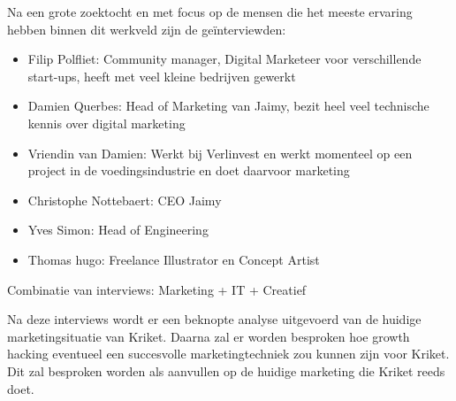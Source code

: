 Na een grote zoektocht en met focus op de mensen die het meeste ervaring hebben binnen dit werkveld zijn de geïnterviewden:
\begin{itemize} 
	\item Filip Polfliet: Community manager, Digital Marketeer voor verschillende start-ups, heeft met veel kleine bedrijven gewerkt
	\item Damien Querbes: Head of Marketing van Jaimy, bezit heel veel technische kennis over digital marketing
	\item Vriendin van Damien: Werkt bij Verlinvest en werkt momenteel op een project in de voedingsindustrie en doet daarvoor marketing
	\item Christophe Nottebaert: CEO Jaimy
	\item Yves Simon: Head of Engineering
	\item Thomas hugo: Freelance Illustrator en Concept Artist
\end{itemize}

Combinatie van interviews: Marketing + IT + Creatief 

Na deze interviews wordt er een beknopte analyse uitgevoerd van de huidige marketingsituatie van Kriket. Daarna zal er worden besproken hoe growth hacking eventueel een succesvolle marketingtechniek zou kunnen zijn voor Kriket. Dit zal besproken worden als aanvullen op de huidige marketing die Kriket reeds doet.
